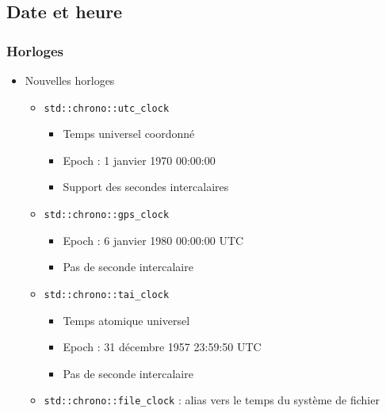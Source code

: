 \documentclass[C++.tex]{subfiles}
\begin{document}
\subsection*{Date et heure}
\begin{frame}[fragile]
	\frametitle{Horloges}
	\begin{itemize}
		\item Nouvelles horloges
		\begin{itemize}
			\item \lstinline|std::chrono::utc_clock|
			\begin{itemize}
				\item Temps universel coordonné
				\item Epoch : 1 janvier 1970 00:00:00
				\item Support des secondes intercalaires
			\end{itemize}
			\item \lstinline|std::chrono::gps_clock|
			\begin{itemize}
				\item Epoch : 6 janvier 1980 00:00:00 UTC
				\item Pas de seconde intercalaire
			\end{itemize}
			\item \lstinline|std::chrono::tai_clock|
			\begin{itemize}
				\item Temps atomique universel
				\item Epoch : 31 décembre 1957 23:59:50 UTC
				\item Pas de seconde intercalaire
			\end{itemize}
			\item \lstinline|std::chrono::file_clock| : alias vers le temps du système de fichier
		\end{itemize}
	\end{itemize}


\end{frame}
\end{document}
